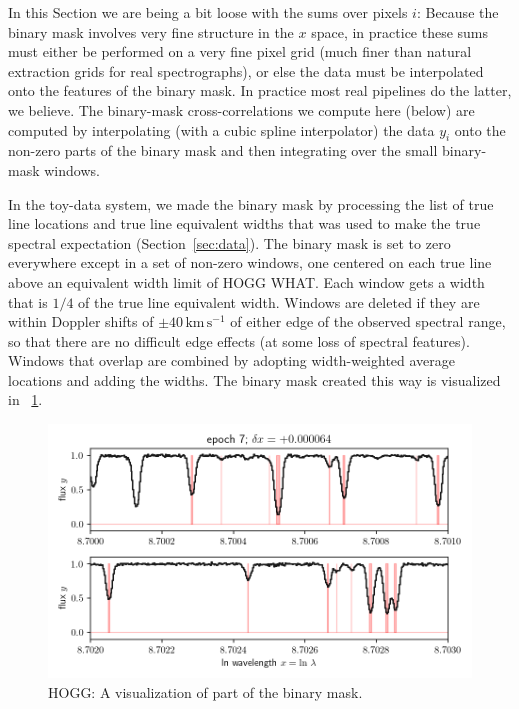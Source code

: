 \documentclass[modern]{aastex631}
\newcommand{\unit}[1]{\mathrm{#1}}
\newcommand{\km}{\unit{km}}
\newcommand{\s}{\unit{s}}
\newcommand{\kmps}{\km\,\s^{-1}}
\newcommand{\sectionname}{Section}
\newcommand{\secref}[1]{\sectionname~\ref{#1}}
\newcommand{\figref}[1]{\figurename~\ref{#1}}
\begin{document}
In this \sectionname{} we are being a bit loose with the sums over pixels $i$:
Because the binary mask involves very fine structure in the $x$ space, in practice these sums must either be performed on a very fine pixel grid (much finer than natural extraction grids for real spectrographs), or else the data must be interpolated onto the features of the binary mask.
In practice most real pipelines do the latter, we believe.
The binary-mask cross-correlations we compute here (below) are computed by interpolating (with a cubic spline interpolator) the data $y_i$ onto the non-zero parts of the binary mask and then integrating over the small binary-mask windows.

In the toy-data system, we made the binary mask by processing the list of true line locations and true line equivalent widths that was used to make the true spectral expectation (\secref{sec:data}).
The binary mask is set to zero everywhere except in a set of non-zero windows, one centered on each true line above an equivalent width limit of HOGG WHAT.
Each window gets a width that is $1/4$ of the true line equivalent width.
Windows are deleted if they are within Doppler shifts of $\pm 40\,\kmps$ of either edge of the observed spectral range, so that there are no difficult edge effects (at some loss of spectral features).
Windows that overlap are combined by adopting width-weighted average locations and adding the widths.
The binary mask created this way is visualized in \figref{fig:binarymask}.

\begin{figure}[t]
  \begin{mdframed}
    \begin{center}
    \includegraphics[width=\textwidth]{../notebook/binarymask.png}
    \end{center}
    \caption{HOGG: A visualization of part of the binary mask.\label{fig:binarymask}}
  \end{mdframed}
\end{figure}
\end{document}
